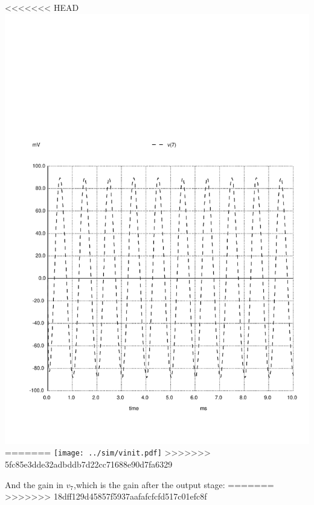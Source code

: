 <<<<<<< HEAD
\includegraphics[width=1\linewidth]{../sim/vo1.pdf}
=======
\texttt{[image: ../sim/vinit.pdf]}
>>>>>>> 5fc85e3dde32adbddb7d22cc71688e90d7fa6329

And the gain in $v_7$,which is the gain after the output stage:
=======
>>>>>>> 18dff129d45857f5937aafafcfcfd517c01efc8f


